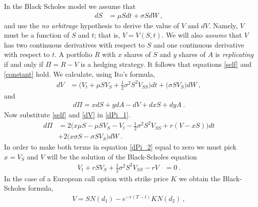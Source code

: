 \documentclass[10pt]{article}
\numberwithin{equation}{section}
\begin{document}
In the Black Scholes model we assume that
\begin{equation}\label{dS}
	\begin{split}
		dS &= \mu S dt +\sigma S dW\:,
	\end{split}
\end{equation}
and use the \emph{no arbitrage} hypothesis to derive the value of $V$ and $dV$. Namely, $V$ must be a function of $S$ and $t$; that is, $V = V(S,t)$. We will also \emph{assume} that $V$ has two continuous derivatives with respect to $S$ and one continuous derivative with respect to $t$. A portfolio $R$ with $x$ shares of $S$ and $y$ shares of $A$ is \emph{replicating} if and only if $\Pi=R-V$ is a hedging strategy. It follows that equations \eqref{self} and \eqref{constant} hold. We calculate, using Ito's formula,
\begin{equation}\label{dV}
	\begin{split}
	dV&= \biggl(V_t+\mu S V_S +\frac{1}{2} \sigma^2 S^2 V_{SS}\biggr)dt+\biggl(\sigma S V_S \biggr)dW\:,
	\end{split}
\end{equation}
and
\begin{equation}\label{dPi_1}
	\begin{split}
	d\Pi = x dS +y dA -dV + dx S+dy A\:.
	\end{split}
\end{equation}
Now substitute \eqref{self} and \eqref{dV} in \eqref{dPi_1}.
\begin{equation}\label{dPi_2}
	\begin{split}
	d\Pi &= 2 \biggl( x \mu S - \mu S V_S -V_t -\frac{1}{2} \sigma^2 S^2 V_{SS}+ r (V-xS) \biggr)dt\\
	&+ 2\biggl( x \sigma S - \sigma S V_S \biggr) dW\:.
	\end{split}
\end{equation}
In order to make both terms in equation \eqref{dPi_2} equal to zero we must pick $x = V_S$ and $V$ will be the solution of the Black-Scholes equation
\begin{equation}\label{BS}
	\begin{split}
	V_t + r S V_S + \frac{1}{2} \sigma^2 S^2 V_{SS}-rV&=0\:.
	\end{split}
\end{equation}
In the case of a European call option with strike price $K$ we obtain the Black-Scholes formula,
\begin{equation*}
	\begin{split}
	V = S N(d_1)-e^{-r(T-t)}K N(d_2)\:,
	\end{split}
\end{equation*}
\end{document}
